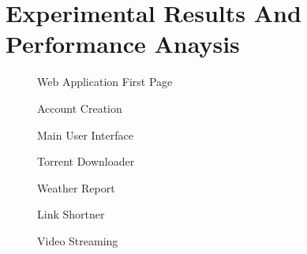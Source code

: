 \chapter{Experimental Results And Performance Anaysis}
\newpage



\begin{figure}[h]
\begin{center}
    \caption{Web Application First Page}
    \label{1}
\end{center}
\end{figure}
    
\begin{figure}[h]
\begin{center}
    \caption{Account Creation}
    \label{1}
\end{center}
\end{figure}
    
    
\begin{figure}[h]
\begin{center}
     \caption{Main User Interface}
    \label{1}
\end{center}
\end{figure}

\begin{figure}[h]
\begin{center}
    \caption{Torrent Downloader}
    \label{1}
\end{center}
\end{figure}


\begin{figure}[h]
\begin{center}
    \caption{Weather Report}
    \label{1}
\end{center}
\end{figure}


\begin{figure}[h]
\begin{center}
    \caption{Link Shortner}
    \label{1}
\end{center}
\end{figure}

\begin{figure}[h]
\begin{center}
    \caption{Video Streaming}
    \label{1}
\end{center}
\end{figure}
